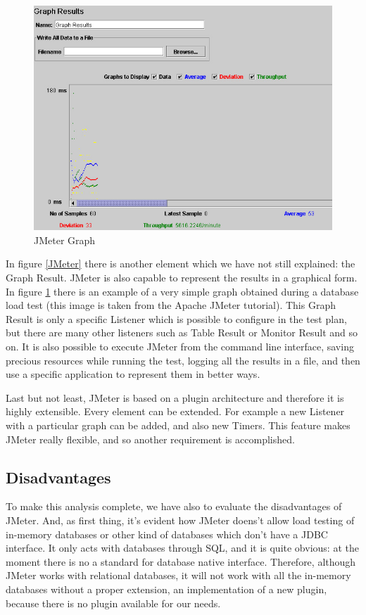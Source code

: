 \begin{figure}[!htp] 
	\begin{center}
		\includegraphics[width=13cm]{img/JMeterGraph.jpg}	
	\end{center}
	\caption{JMeter Graph}
	\label{JMeterGraph}	
\end{figure}

In figure \ref{JMeter} there is another element which we have not still explained: the Graph Result. JMeter is also capable to represent the results in a graphical form. In figure \ref{JMeterGraph} there is an example of a very simple graph obtained during a database load test (this image is taken from the Apache JMeter tutorial). This Graph Result is only a specific Listener which is possible to configure in the test plan, but there are many other listeners such as Table Result or Monitor Result and so on. It is also possible to execute JMeter from the command line interface, saving precious resources while running the test, logging all the results in a file, and then use a specific application to represent them in better ways.

Last but not least, JMeter is based on a plugin architecture and therefore it is highly extensible. Every element can be extended. For example a new Listener with a particular graph can be added, and also new Timers. This feature makes JMeter really flexible, and so another requirement is accomplished.

		\subsection{Disadvantages}
To make this analysis complete, we have also to evaluate the disadvantages of JMeter. And, as first thing, it's evident how JMeter doens't allow load testing of in-memory databases or other kind of databases which don't have a JDBC interface. It only acts with databases through SQL, and it is quite obvious: at the moment there is no a standard for database native interface. Therefore, although JMeter works with relational databases, it will not work with all the in-memory databases without a proper extension, an implementation of a new plugin, because there is no plugin available for our needs.

